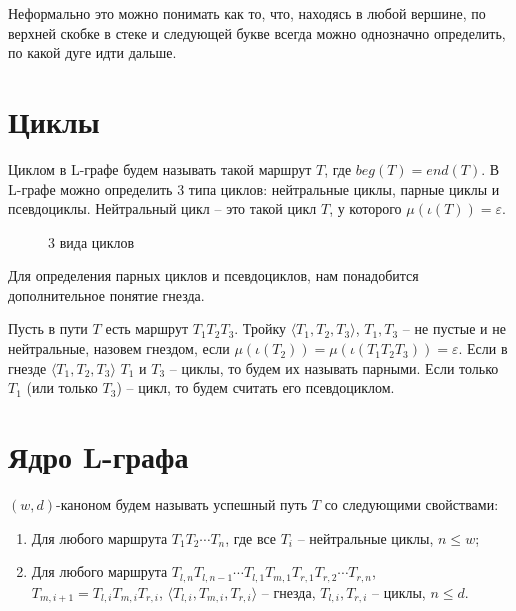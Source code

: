 Неформально это можно понимать как то, что, находясь в любой вершине, 
по верхней скобке в стеке и следующей букве всегда можно однозначно определить, по какой дуге идти дальше.

\section{Циклы}

Циклом в L-графе будем называть такой маршрут $T$, где $beg(T) = end(T)$. 
В L-графе можно определить 3 типа циклов: нейтральные циклы, парные циклы и псевдоциклы.
Нейтральный цикл -- это такой цикл $T$, у которого $\mu(\iota(T)) = \varepsilon$.

\begin{figure}
    \centering
    \qquad
    \qquad
    \caption{3 вида циклов}
    \label{loop-kinds-example}
\end{figure}


Для определения парных циклов и псевдоциклов, нам понадобится дополнительное понятие гнезда.

Пусть в пути $T$ есть маршрут $T_1 T_2 T_3$. 
Тройку $\langle T_1, T_2, T_3 \rangle$, $T_1, T_3$ -- не пустые и не нейтральные, назовем гнездом, 
если $\mu(\iota(T_2)) = \mu(\iota(T_1 T_2 T_3)) = \varepsilon$.
Если в гнезде $\langle T_1, T_2, T_3 \rangle$ $T_1$ и $T_3$ -- циклы, то будем их называть парными.
Если только $T_1$ (или только $T_3$) -- цикл, то будем считать его псевдоциклом.

\section{Ядро L-графа}

$(w,d)$-каноном будем называть успешный путь $T$ со следующими свойствами:
\begin{enumerate}[label=\arabic*)]
    \item Для любого маршрута $T_1 T_2 \cdots T_n$, где все $T_i$ -- нейтральные циклы, $n \leq w$;
    \item Для любого маршрута $T_{l,n} T_{l,n-1} \cdots T_{l,1} T_{m,1} T_{r,1} T_{r,2} \cdots T_{r,n}$,\\
       $T_{m,i+1} = T_{l,i} T_{m,i} T_{r,i}$, $\langle T_{l,i}, T_{m,i}, T_{r,i} \rangle$ -- гнезда, $T_{l,i}, T_{r,i}$ -- циклы,
       $n \leq d$.
\end{enumerate}

